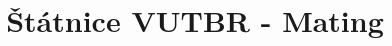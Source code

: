 \documentclass[a4]{report}
\theoremstyle{definition}
\begin{document}
\title{Štátnice VUTBR - Mating}
\maketitle

\tableofcontents










\end{document}
